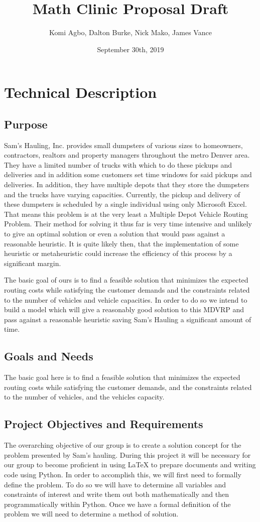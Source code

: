 \documentclass{article}
\title{Math Clinic Proposal Draft}
\author{Komi Agbo, Dalton Burke, Nick Mako, James Vance}
\date{September 30th, 2019}
\begin{document}
\maketitle
\newpage

\section{Technical Description}

\subsection{Purpose}
Sam’s Hauling, Inc. provides small dumpsters of various sizes to homeowners, contractors, realtors and property managers throughout the metro Denver area. They have a limited number of trucks with which to do these pickups and deliveries and in addition some customers set time windows for said pickups and deliveries. In addition, they have multiple depots that they store the dumpsters and the trucks have varying capacities. Currently, the pickup and delivery of these dumpsters is scheduled by a single individual using only Microsoft Excel. That means this problem is at the very least a Multiple Depot Vehicle Routing Problem. Their method for solving it thus far is very time intensive and unlikely to give an optimal solution or even a solution that would pass against a reasonable heuristic. It is quite likely then, that the implementation of some heuristic or metaheuristic could increase the efficiency of this process by a significant margin.

The basic goal of ours is to find a feasible solution that minimizes the expected routing costs while satisfying the customer demands and the constraints related to the number of vehicles and vehicle capacities. In order to do so we intend to build a model which will give a reasonably good solution to this MDVRP and pass against a reasonable heuristic saving Sam’s Hauling a significant amount of time.


\subsection{Goals and Needs}
The basic goal here is to find a feasible solution that minimizes the expected routing costs while satisfying the customer demands, and the constraints related to the number of vehicles, and the vehicles capacity.

\subsection{Project Objectives and Requirements}
The overarching objective of our group is to create a solution concept for the problem presented by Sam's hauling.
During this project it will be necessary for our group to become proficient in using LaTeX to prepare documents and writing code using Python.
In order to accomplish this, we will first need to formally define the problem. To do so we will have to determine all variables and constraints of interest and write them out both mathematically and then programmatically within Python.
Once we have a formal definition of the problem we will need to determine a method of solution.
\end{document}
